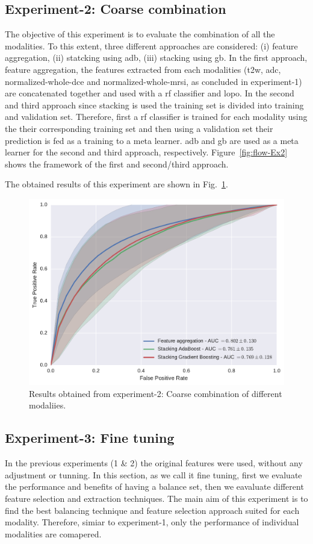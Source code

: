 \subsection{Experiment-2: Coarse combination} \label{subsec:chp6:exp-res:Ex2}
The objective of this experiment is to evaluate the combination of all the modalities.
To this extent, three different approaches are considered: (i) feature aggregation, (ii) statcking using \ac{adb}, (iii) stacking using \ac{gb}. 
In the first approach, feature aggregation, the features extracted from each modalities (\ac{t2w}, \ac{adc}, normalized-whole-\ac{dce} and normalized-whole-\ac{mrsi}, as concluded in experiment-1) are concatenated together and used with a \ac{rf} classifier and \ac{lopo}. 
In the second and third approach since stacking is used the training set is divided into training and validation set.
Therefore, first a \ac{rf} classifier is trained for each modality using the their corresponding training set and then using a validation set their prediction is fed as a training to a meta learner.
\Ac{adb} and \ac{gb} are used as a meta learner for the second and third approach, respectively. 
Figure~\ref{fig:flow-Ex2} shows the framework of the first and second/third approach. 

The obtained results of this experiment are shown in Fig.~\ref{fig:res-Exp2}.
\begin{figure}
  \centering
  \includegraphics[width=0.7\linewidth]{6_pipeline/figures/exp-2/comb_all.pdf}
  \caption[Results obtained from experiment-2]{Results obtained from experiment-2: Coarse combination of different modaliies.}
  \label{fig:res-Exp2}
\end{figure}

\subsection{Experiment-3: Fine tuning}\label{subsec:chp6:exp-res:Ex3}
In the previous experiments (1 \& 2) the original features were used, without any adjustment or tunning. 
In this section, as we call it fine tuning, first we evaluate the performance and benefits of having a balance set, then we eavaluate different feature selection and extraction techniques.
The main aim of this experiment is to find the best balancing technique and feature selection approach suited for each modality. 
Therefore, simiar to experiment-1, only the performance of individual modalities are comapered. 

